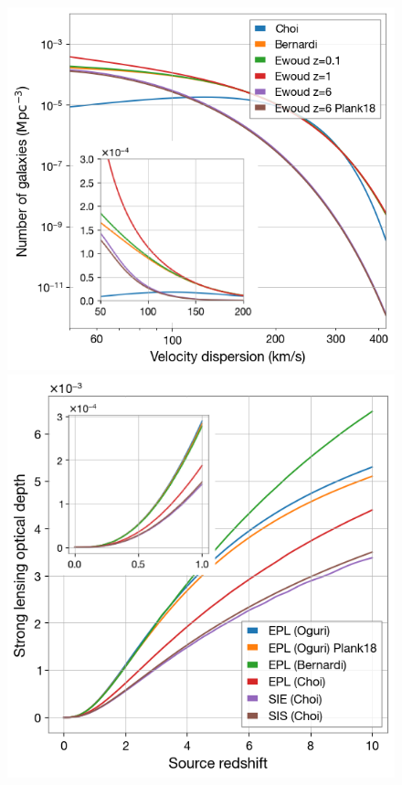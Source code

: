 \documentclass[linenumbers]{aastex631}
\begin{document}
\begin{figure}
  \centering
  \includegraphics[height=.34\textheight]{figures/velocity_dispersion.png}\includegraphics[height=.34\textheight]{figures/optical_depth.png}

\end{figure}
\end{document}
